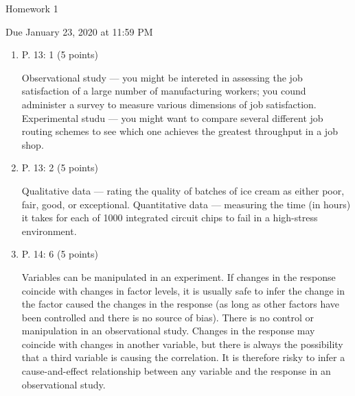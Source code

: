 \documentclass{article}
\begin{document}
\begin{center} \LARGE
Homework 1 
\end{center}
\begin{center} \Large
Due January 23, 2020 at 11:59 PM 
\end{center}



\begin{enumerate}
	\item P. 13: 1 (5 points)

		{\color{red} Observational study --- you might be intereted in assessing the
		job satisfaction of a large number of manufacturing workers;
		you cound administer a survey to measure various dimensions of
		job satisfaction. Experimental studu --- you might want to
		compare several different job routing schemes to see which one
	achieves the greatest throughput in a job shop.}

	\item P. 13: 2 (5 points)

		{\color{red}
		Qualitative data --- rating the quality of batches of ice
		cream as either poor, fair, good, or exceptional.
		Quantitative data --- measuring the time (in hours) it takes
		for each of 1000 integrated circuit chips to fail in a
		high-stress environment.
		
		}
	\item P. 14: 6 (5 points)
		{\color{red}
		Variables can be manipulated in an experiment. If changes in
		the response coincide with changes in factor levels, it is
		usually safe to infer the change in the factor caused the
		changes in the response (as long as other factors have been
		controlled and there is no source of bias). There is no
		control or manipulation in an observational study. Changes in
		the response may coincide with changes in another variable, but
		there is always the possibility that a third variable is
		causing the correlation. It is therefore risky to infer a
		cause-and-effect relationship between any variable and the
		response in an observational study. 

}
\end{enumerate}
\end{document}
